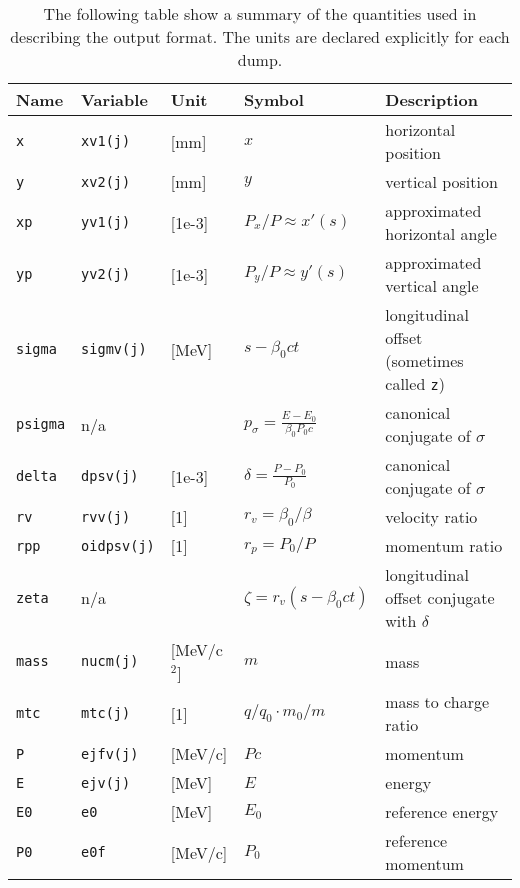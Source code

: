 \bigskip
\begin{center}
\begin{longtabu}{@{}llllp{7cm}}
    \caption{The following table show a summary of the quantities used in describing the output format. The units are declared explicitly for each dump.}
    \label{tab:sixtrackunits} \\*
    \textbf{Name}   & \textbf{Variable} & \textbf{Unit} & \textbf{Symbol} & \textbf{Description} \\
    \hline
    \texttt{x}      & \texttt{xv1(j)}    & [mm]         & $x$                  & horizontal position\\
    \texttt{y}      & \texttt{xv2(j)}    & [mm]         & $y$                  & vertical position\\
    \texttt{xp}     & \texttt{yv1(j)}    & [1e-3]       & $P_x/P\approx x'(s)$ & approximated horizontal angle\\
    \texttt{yp}     & \texttt{yv2(j)}    & [1e-3]       & $P_y/P\approx y'(s)$ & approximated vertical angle\\
    \texttt{sigma}  & \texttt{sigmv(j)}  & [MeV]        & $s-\beta_0 c t $     & longitudinal offset (sometimes called \texttt{z})\\
    \texttt{psigma} & n/a                &              & $p_\sigma=\frac{E-E_0}{\beta_0 P_0 c}$ & canonical conjugate of $\sigma$ \\
    \texttt{delta}  & \texttt{dpsv(j)}   & [1e-3]       & $\delta=\frac{P-P_0}{P_0}$ & canonical conjugate of $\sigma$ \\
    \texttt{rv}     & \texttt{rvv(j)}    & [1]          & $r_v=\beta_0/\beta$  & velocity ratio \\
    \texttt{rpp}    & \texttt{oidpsv(j)} & [1]          & $r_p=P_0/P$          & momentum ratio \\
    \texttt{zeta}   & n/a                &              & $\zeta=r_v(s-\beta_0 c t)$ & longitudinal offset conjugate with $\delta$\\
    \texttt{mass}   & \texttt{nucm(j)}   & [MeV/c$^2$]  & $m$                  & mass \\
    \texttt{mtc}    & \texttt{mtc(j)}    & [1]          & $q/q_0 \cdot m_0/m $ & mass to charge ratio\\
    \texttt{P}      & \texttt{ejfv(j)}   & [MeV/c]      & $Pc$                 & momentum \\
    \texttt{E}      & \texttt{ejv(j)}    & [MeV]        & $E$                  & energy \\
    \texttt{E0}     & \texttt{e0}        & [MeV]        & $E_0$                & reference energy \\
    \texttt{P0}     & \texttt{e0f}       & [MeV/c]      & $P_0$                & reference momentum \\
\end{longtabu}
\end{center}

